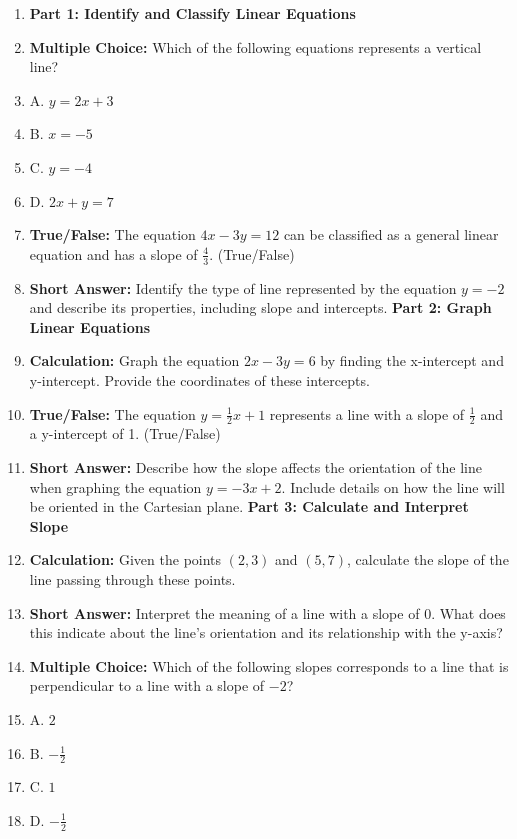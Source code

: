 \begin{enumerate}
    \item \textbf{Part 1: Identify and Classify Linear Equations}
    \item \textbf{Multiple Choice:} Which of the following equations represents a vertical line?
    \item A. $y = 2x + 3$
    \item B. $x = -5$
    \item C. $y = -4$
    \item D. $2x + y = 7$
    \item \textbf{True/False:} The equation $4x - 3y = 12$ can be classified as a general linear equation and has a slope of $\frac{4}{3}$. (True/False)
    \item \textbf{Short Answer:} Identify the type of line represented by the equation $y = -2$ and describe its properties, including slope and intercepts. \textbf{Part 2: Graph Linear Equations}
    \item \textbf{Calculation:} Graph the equation $2x - 3y = 6$ by finding the x-intercept and y-intercept. Provide the coordinates of these intercepts.
    \item \textbf{True/False:} The equation $y = \frac{1}{2}x + 1$ represents a line with a slope of $\frac{1}{2}$ and a y-intercept of 1. (True/False)
    \item \textbf{Short Answer:} Describe how the slope affects the orientation of the line when graphing the equation $y = -3x + 2$. Include details on how the line will be oriented in the Cartesian plane. \textbf{Part 3: Calculate and Interpret Slope}
    \item \textbf{Calculation:} Given the points $(2, 3)$ and $(5, 7)$, calculate the slope of the line passing through these points.
    \item \textbf{Short Answer:} Interpret the meaning of a line with a slope of $0$. What does this indicate about the line's orientation and its relationship with the y-axis?
    \item \textbf{Multiple Choice:} Which of the following slopes corresponds to a line that is perpendicular to a line with a slope of $-2$?
    \item A. $2$
    \item B. $-\frac{1}{2}$
    \item C. $1$
    \item D. $-\frac{1}{2}$
\end{enumerate}

